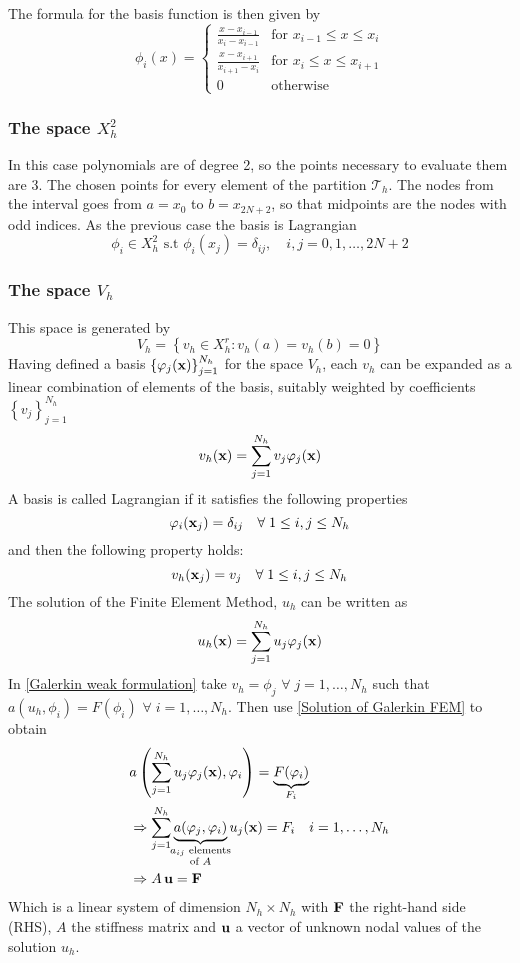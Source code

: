 The formula for the basis function is then given by 
\begin{equation}
    \phi_i(x) = \begin{cases}
        \displaystyle\frac{x-x_{i-1}}{x_i - x_{i-1}} & \text{for }x_{i-1} \leq x \leq x_i \\
        \displaystyle\frac{x-x_{i+1}}{x_{i+1} - x_i} & \text{for }x_i \leq x \leq x_{i+1} \\
        0 & \text{otherwise}
    \end{cases}
\end{equation}
\subsubsection*{The space \(X^2_h\)}
In this case polynomials are of degree 2, so the points necessary to evaluate them are \(3\). The chosen points for every element of the partition \(\mathcal{T}_h\). The nodes from the interval goes from \(a = x_0\) to \(b = x_{2N + 2}\), so that midpoints are the nodes with odd indices. As the previous case the basis is Lagrangian
\[
    \phi_i \in X^2_h \text{ s.t } \phi_i(x_j) = \delta_{ij}, \quad i, j = 0, 1, \ldots, 2N+2
\]
\subsubsection*{The space \(V_h\)}
This space is generated by 
\[
    V_h = \left\{v_h \in X^r_h : v_h(a) = v_h(b) = 0 \right\}
\]
Having defined a basis \(\left\lbrace\varphi_j(\textbf{x})\right\rbrace_{j=1}^{N_h}\) for the space \(V_h\), each \(v_h\) can be expanded as a linear combination of elements of the basis, suitably weighted by coefficients \(\left\{v_j\right\}_{j=1}^{N_h}\)
\[
    v_h(\textbf{x}) = \sum_{j=1}^{N_h} v_j \varphi_j(\textbf{x})
\]
A basis is called Lagrangian if it satisfies the following properties
\[
    \varphi_i(\textbf{x}_j) = \delta_{ij} \quad \forall \; 1 \leq i,j \leq N_h
\]
and then the following property holds:
\[
    v_h(\textbf{x}_j) = v_j \quad \forall \; 1 \leq i,j \leq N_h
\]
The solution of the Finite Element Method, \(u_h\) can be written as 
\begin{equation}
    u_h(\textbf{x}) = \sum_{j=1}^{N_h} u_j\varphi_j (\textbf{x}) \label{Solution of Galerkin FEM}
\end{equation}
In \eqref{Galerkin weak formulation} take \(v_h = \phi_j\) \(\forall \; j = 1,\ldots, N_h \) such that \(a(u_h,\phi_i) = F(\phi_i)\) \(\forall \; i = 1,\ldots,N_h\). Then use \eqref{Solution of Galerkin FEM} to obtain 
\begin{align*}
    &a\left( \sum_{j=1}^{N_h} u_j\phi_j (\vect{x}), \phi_i \right) = \underbrace{F(\phi_i)}_{F_i} \\ 
    &\Rightarrow \sum_{j=1}^{N_h} \underbrace{a(\phi_j, \phi_i)}_{\mathclap{\substack{a_{ij} \text{ elements}\\ \text{of } A}}} u_j (\vect{x}) = F_i \quad i = 1, \ldots, N_h \\
    &\Rightarrow A\,\vect{u} = \vect{F}
\end{align*}
Which is a linear system of dimension \(N_h \times N_h\) with \(\textbf{F}\) the right-hand side (RHS), \(A\) the stiffness matrix and \(\textbf{u}\) a vector of unknown nodal values of the solution \(u_h\).
